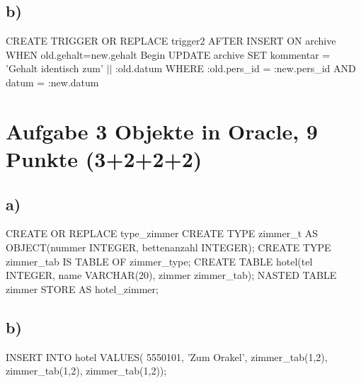 \documentclass[12pt]{scrreprt}
\begin{document}
\subsection*{b)}
CREATE TRIGGER OR REPLACE trigger2\newline
\hspace*{5mm}AFTER INSERT ON archive\newline
\hspace*{5mm}WHEN old.gehalt=new.gehalt\newline
Begin\newline
\hspace*{5mm}UPDATE archive SET kommentar = 'Gehalt identisch zum' $||$ :old.datum\newline
\hspace*{5mm}WHERE :old.pers\_id = :new.pers\_id AND\newline
\hspace*{5mm}datum = :new.datum\newline
\section*{Aufgabe 3 Objekte in Oracle, 9 Punkte (3+2+2+2)}
\subsection*{a)}
CREATE OR REPLACE type\_zimmer\newline
CREATE TYPE zimmer\_t AS OBJECT(nummer INTEGER, bettenanzahl INTEGER);\newline
CREATE TYPE zimmer\_tab IS TABLE OF zimmer\_type;\newline
CREATE TABLE hotel(tel INTEGER, name VARCHAR(20), zimmer zimmer\_tab);\newline
NASTED TABLE zimmer STORE AS hotel\_zimmer;\newline
\subsection*{b)}
INSERT INTO hotel VALUES(\newline
\hspace*{5mm}5550101, 'Zum Orakel',\newline
\hspace*{5mm}zimmer\_tab(1,2),\newline
\hspace*{5mm}zimmer\_tab(1,2),\newline
\hspace*{5mm}zimmer\_tab(1,2));\newline
\end{document}

